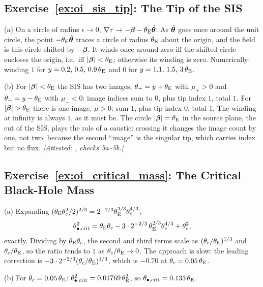 \subsection*{Exercise~\ref{ex:oi_sis_tip}: The Tip of the SIS}

(a) On a circle of radius $\epsilon\to0$,
$\nabla\tau\to-\boldsymbol{\beta}-\theta_{\mathrm{E}}\hat{\boldsymbol{\theta}}$.  As $\hat{\boldsymbol{\theta}}$
goes once around the unit circle, the point $-\theta_{\mathrm{E}}\hat{\boldsymbol{\theta}}$
traces a circle of radius $\theta_{\mathrm{E}}$ about the origin, and the field is
this circle shifted by $-\boldsymbol{\beta}$.  It winds once around zero iff the
shifted circle encloses the origin, i.e.\ iff $|\boldsymbol{\beta}|<\theta_{\mathrm{E}}$;
otherwise its winding is zero.  Numerically: winding $1$ for
$y=0.2,\,0.5,\,0.9\,\theta_{\mathrm{E}}$ and $0$ for $y=1.1,\,1.5,\,3\,\theta_{\mathrm{E}}$.

(b) For $|\boldsymbol{\beta}|<\theta_{\mathrm{E}}$ the SIS has two images,
$\theta_+=y+\theta_{\mathrm{E}}$ with $\mu_+>0$ and $\theta_-=y-\theta_{\mathrm{E}}$ with
$\mu_-<0$: image indices sum to $0$, plus tip index $1$, total $1$.
For $|\vecbeta|>\thetaE$ there is one image, $\mu>0$: sum $1$, plus tip
index $0$, total $1$.  The winding at infinity is always $1$, as it must
be.  The circle $|\boldsymbol{\beta}|=\theta_{\mathrm{E}}$ in the source plane, the
cut of the SIS, plays the role of a caustic: crossing it
changes the image count by one, not two, because the second ``image''
is the singular tip, which carries index but no flux.
\emph{[Attested: , checks 5a--5b.]}

\subsection*{Exercise~\ref{ex:oi_critical_mass}: The Critical Black-Hole Mass}

(a) Expanding $(\theta_{\mathrm{E}}\theta_c^2/2)^{2/3}=2^{-2/3}\theta_{\mathrm{E}}^{2/3}\theta_c^{4/3}$,
\[
  \theta_{\bullet,\rm crit}^2 = \theta_{\mathrm{E}}\theta_c - 3\cdot2^{-2/3}\,\theta_{\mathrm{E}}^{2/3}\theta_c^{4/3} + \theta_c^2 ,
\]
exactly.  Dividing by $\theta_{\mathrm{E}}\theta_c$, the second and third terms
scale as $(\theta_c/\theta_{\mathrm{E}})^{1/3}$ and $\theta_c/\theta_{\mathrm{E}}$, so the ratio
tends to $1$ as $\theta_c/\theta_{\mathrm{E}}\to0$.  The approach is slow: the
leading correction is $-3\cdot2^{-2/3}(\theta_c/\theta_{\mathrm{E}})^{1/3}$, which
is $-0.70$ at $\theta_c=0.05\,\theta_{\mathrm{E}}$.

(b) For $\theta_c=0.05\,\theta_{\mathrm{E}}$:
$\theta_{\bullet,\rm crit}^2=0.01769\,\theta_{\mathrm{E}}^2$, so
$\theta_{\bullet,\rm crit}=0.133\,\theta_{\mathrm{E}}$.


